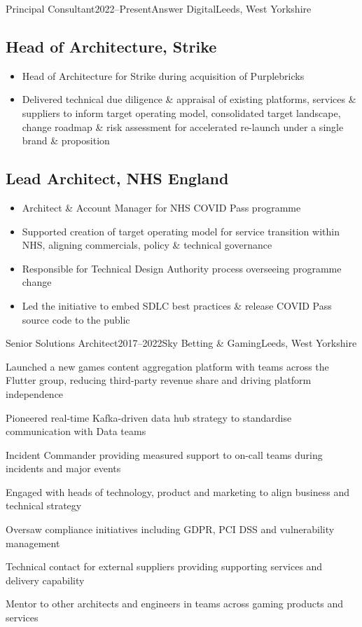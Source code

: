 \documentclass{cv}
\begin{document}
\begin{experienceplain}{Principal Consultant}{2022--Present}{Answer Digital}{Leeds, West Yorkshire}
\subsection{Head of Architecture, Strike}
\begin{itemize}
\item Head of Architecture for Strike during acquisition of Purplebricks
\item Delivered technical due diligence \& appraisal of existing platforms, services \& suppliers
      to inform target operating model, consolidated target landscape, change roadmap \& risk
      assessment for accelerated re-launch under a single brand \& proposition
\end{itemize}

\subsection{Lead Architect, NHS England}
\begin{itemize}
\item Architect \& Account Manager for NHS COVID Pass programme
\item Supported creation of target operating model for service transition within NHS, aligning
      commercials, policy \& technical governance
\item Responsible for Technical Design Authority process overseeing programme change
\item Led the initiative to embed SDLC best practices \& release COVID Pass source code to
      the public
\end{itemize}
\end{experienceplain}


\begin{experience}{Senior Solutions Architect}{2017--2022}{Sky Betting \& Gaming}{Leeds, West Yorkshire}
\item Launched a new games content aggregation platform with teams across the Flutter group, reducing
      third-party revenue share and driving platform independence
\item Pioneered real-time Kafka-driven data hub strategy to standardise communication with Data teams
\item Incident Commander providing measured support to on-call teams during incidents and major events
\item Engaged with heads of technology, product and marketing to align business and technical strategy
\item Oversaw compliance initiatives including GDPR, PCI DSS and vulnerability management
\item Technical contact for external suppliers providing supporting services and delivery capability
\item Mentor to other architects and engineers in teams across gaming products and services
\end{experience}
\end{document}
